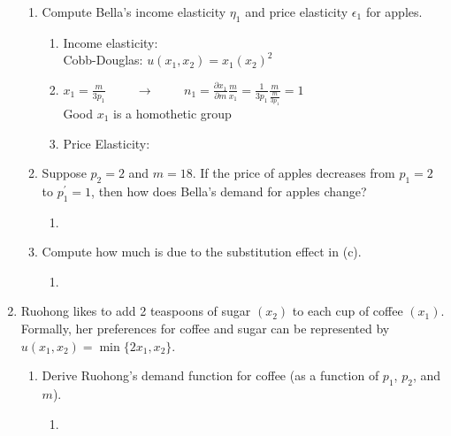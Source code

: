 \documentclass[11pt]{article}
\begin{document}
\begin{enumerate}
\begin{enumerate}
        \item Compute Bella's income elasticity $\eta_{1}$ and price elasticity $\epsilon_{1}$ for apples.
        \begin{enumerate}
            \item Income elasticity: \\
            Cobb-Douglas: $u(x_{1},x_{2}) = x_1(x_2)^2$
            \item $x_1 = \frac{m}{3p_1} \hspace{1cm} \rightarrow \hspace{1cm} n_1 = \frac{\partial x_1}{\partial m} \frac{m}{x_1} = \frac{1}{3p_1} \frac{m}{\frac{m}{3p_1}} = 1$\\
            Good $x_1$ is a homothetic group
            \item Price Elasticity:\\
            
        \end{enumerate}

        \item Suppose $p_{2}=2$ and $m=18$. If the price of apples decreases from $p_{1}=2$ to $p_{1}^{\prime}=1$, then how does Bella's demand for apples change?
        \begin{enumerate}
            \item 
        \end{enumerate}

        \item Compute how much is due to the substitution effect in (c).
        \begin{enumerate}
            \item 
        \end{enumerate}

    \end{enumerate}


\item Ruohong likes to add 2 teaspoons of sugar $(x_{2})$ to each cup of coffee $(x_{1})$. Formally, her preferences for coffee and sugar can be represented by $u(x_{1},x_{2})=\min\{2x_{1},x_{2}\}$.

    \begin{enumerate}
        \item Derive Ruohong's demand function for coffee (as a function of $p_{1}$, $p_{2}$, and $m$).
        \begin{enumerate}
            \item 
        \end{enumerate}


\end{enumerate}
\end{enumerate}
\end{document}

